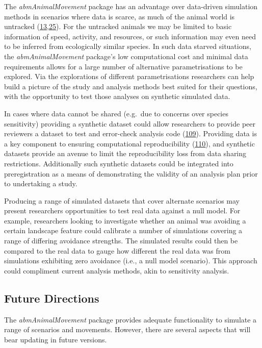 \documentclass[10pt,a4paper]{article}
\begin{document}
The \emph{abmAnimalMovement} package has an advantage over data-driven simulation methods in scenarios where data is scarce, as much of the animal world is untracked (\protect\hyperlink{ref-joo_recent_2022}{13},\protect\hyperlink{ref-crane_lots_2021}{25}).
For the untracked animals we may be limited to basic information of speed, activity, and resources, or such information may even need to be inferred from ecologically similar species.
In such data starved situations, the \emph{abmAnimalMovement} package's low computational cost and minimal data requirements allows for a large number of alternative parametrisations to be explored.
Via the explorations of different parametrisations researchers can help build a picture of the study and analysis methods best suited for their questions, with the opportunity to test those analyses on synthetic simulated data.

In cases where data cannot be shared (e.g.~due to concerns over species sensitivity) providing a synthetic dataset could allow researchers to provide peer reviewers a dataset to test and error-check analysis code (\protect\hyperlink{ref-Quintana2020}{109}).
Providing data is a key component to ensuring computational reproducibility (\protect\hyperlink{ref-Gerstner2017}{110}), and synthetic datasets provide an avenue to limit the reproducibility loss from data sharing restrictions.
Additionally such synthetic datasets could be integrated into preregistration as a means of demonstrating the validity of an analysis plan prior to undertaking a study.

Producing a range of simulated datasets that cover alternate scenarios may present researchers opportunities to test real data against a null model.
For example, researchers looking to investigate whether an animal was avoiding a certain landscape feature could calibrate a number of simulations covering a range of differing avoidance strengths.
The simulated results could then be compared to the real data to gauge how different the real data was from simulations exhibiting zero avoidance (i.e., a null model scenario).
This approach could compliment current analysis methods, akin to sensitivity analysis.

\hypertarget{future-directions}{%
\subsection{Future Directions}\label{future-directions}}

The \emph{abmAnimalMovement} package provides adequate functionality to simulate a range of scenarios and movements.
However, there are several aspects that will bear updating in future versions.
\end{document}
